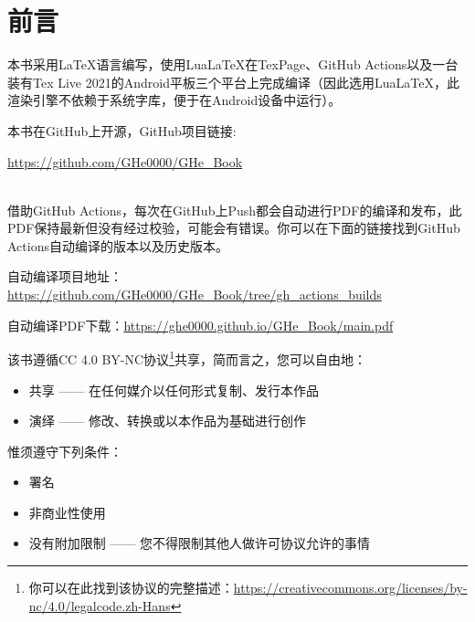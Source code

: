 \documentclass{gbook}
\begin{document}
\everymath{\displaystyle}


 

\newpage


\setcounter{page}{1}

\section{前言}

本书采用\LaTeX 语言编写，使用Lua\LaTeX 在TexPage、GitHub Actions以及一台装有Tex Live 2021的Android平板三个平台上完成编译（因此选用Lua\LaTeX，此渲染引擎不依赖于系统字库，便于在Android设备中运行）。
~\\

\begin{minipage}[b]{0.62\linewidth}
本书在GitHub上开源，GitHub项目链接:

\url{https://github.com/GHe0000/GHe_Book} 
\end{minipage}
\hfill
\begin{minipage}[b]{0.1\linewidth}
\end{minipage}
~\\

借助GitHub Actions，每次在GitHub上Push都会自动进行PDF的编译和发布，此PDF保持最新但没有经过校验，可能会有错误。你可以在下面的链接找到GitHub Actions自动编译的版本以及历史版本。

自动编译项目地址：\url{https://github.com/GHe0000/GHe_Book/tree/gh_actions_builds}

自动编译PDF下载：\url{https://ghe0000.github.io/GHe_Book/main.pdf}

该书遵循CC 4.0 BY-NC协议\footnote{你可以在此找到该协议的完整描述：\url{https://creativecommons.org/licenses/by-nc/4.0/legalcode.zh-Hans}}共享，简而言之，您可以自由地：
\begin{itemize}
    \item 共享 —— 在任何媒介以任何形式复制、发行本作品
    \item 演绎 —— 修改、转换或以本作品为基础进行创作
\end{itemize}

惟须遵守下列条件：
\begin{itemize}
    \item 署名
    \item 非商业性使用
    \item 没有附加限制 —— 您不得限制其他人做许可协议允许的事情
\end{itemize}
\end{document}
